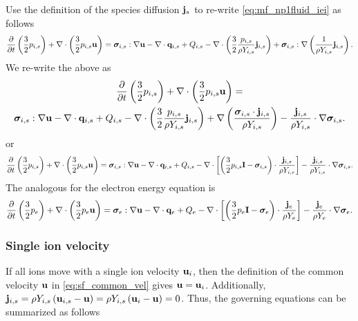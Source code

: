 \documentclass[a4paper,11pt]{report}
\begin{document}
Use the definition of the species diffusion $\mathbf{j}_s$ to re-write \cref{eq:mf_np1fluid_iei} as follows
\begin{equation*}
    \frac{\partial}{\partial t} \left( \frac{3}{2} p_{i,s} \right) + \nabla \cdot \left( \frac{3}{2} p_{i,s} \mathbf{u} \right) = \bm \sigma_{i,s} : \nabla \mathbf{u} - \nabla \cdot \mathbf{q}_{i,s} + Q_{i,s} - \nabla \cdot \left( \frac{3}{2} \frac{p_{i,s}}{\rho Y_{i,s}} \mathbf{j}_{i,s} \right) + \bm \sigma_{i,s} : \nabla \left( \frac{1}{\rho Y_{i,s}} \mathbf{j}_{i,s} \right).
\end{equation*}
We re-write the above as
\begin{multline*}
    \frac{\partial}{\partial t} \left( \frac{3}{2} p_{i,s} \right) + \nabla \cdot \left( \frac{3}{2} p_{i,s} \mathbf{u} \right) = \\
    \bm \sigma_{i,s} : \nabla \mathbf{u} - \nabla \cdot \mathbf{q}_{i,s} + Q_{i,s} - \nabla \cdot \left( \frac{3}{2} \frac{p_{i,s}}{\rho Y_{i,s}} \mathbf{j}_{i,s} \right) + \nabla \left( \frac{\bm \sigma_{i,s} \cdot \mathbf{j}_{i,s}}{\rho Y_{i,s}} \right) - \frac{\mathbf{j}_{i,s}}{\rho Y_{i,s}} \cdot \nabla \bm \sigma_{i,s}.
\end{multline*}
or
\begin{equation}
    \frac{\partial}{\partial t} \left( \frac{3}{2} p_{i,s} \right) + \nabla \cdot \left( \frac{3}{2} p_{i,s} \mathbf{u} \right) = \bm \sigma_{i,s} : \nabla \mathbf{u} - \nabla \cdot \mathbf{q}_{i,s} + Q_{i,s} - \nabla \cdot \left[ \left( \frac{3}{2} p_{i,s} \mathbf{I} - \bm \sigma_{i,s} \right) \cdot \frac{\mathbf{j}_{i,s}}{\rho Y_{i,s}}  \right] - \frac{\mathbf{j}_{i,s}}{\rho Y_{i,s}} \cdot \nabla \bm \sigma_{i,s}.
\end{equation}
The analogous for the electron energy equation is
\begin{equation}
    \frac{\partial}{\partial t} \left( \frac{3}{2} p_e \right) + \nabla \cdot \left( \frac{3}{2} p_e \mathbf{u} \right) = \bm \sigma_e : \nabla \mathbf{u} - \nabla \cdot \mathbf{q}_e + Q_e - \nabla \cdot \left[ \left( \frac{3}{2} p_e \mathbf{I} - \bm \sigma_e \right) \cdot \frac{\mathbf{j}_e}{\rho Y_e}  \right] - \frac{\mathbf{j}_e}{\rho Y_e} \cdot \nabla \bm \sigma_e.
\end{equation}

\subsubsection{Single ion velocity}
If all ions move with a single ion velocity $\mathbf{u}_i$, then the definition of the common velocity $\mathbf{u}$ in \cref{eq:sf_common_vel} gives $\mathbf{u} = \mathbf{u}_i$. Additionally, $\mathbf{j}_{i,s} = \rho Y_{i,s} \left( \mathbf{u}_{i,s} - \mathbf{u} \right) = \rho Y_{i,s} \left( \mathbf{u}_i - \mathbf{u} \right) = 0$. Thus, the governing equations can be summarized as follows
\end{document}
